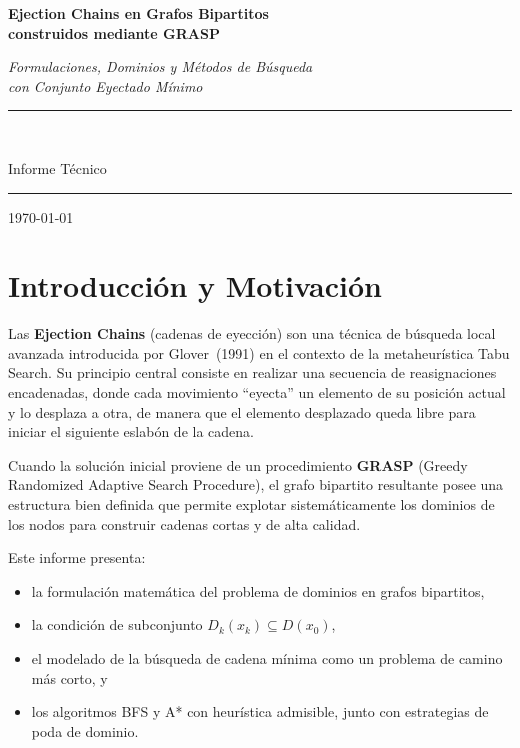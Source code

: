 \documentclass[12pt, a4paper]{article}
\theoremstyle{definition}
\theoremstyle{plain}
\theoremstyle{remark}
\newcommand{\dom}[1]{D\!\left(#1\right)}
\newcommand{\domk}[2]{D_{#1}\!\left(#2\right)}
\begin{document}
\begin{titlepage}
  \centering
  \vspace*{2cm}
  {\LARGE\bfseries Ejection Chains en Grafos Bipartitos\\[0.4em]
   construidos mediante GRASP\par}
  \vspace{1.5cm}
  {\large\itshape Formulaciones, Dominios y Métodos de Búsqueda\\
   con Conjunto Eyectado Mínimo\par}
  \vspace{3cm}
  \rule{0.6\linewidth}{0.8pt}\\[0.4em]
  {\large Informe Técnico\par}
  \rule{0.6\linewidth}{0.8pt}
  \vfill
  {\large \today\par}
\end{titlepage}

\tableofcontents
\newpage

\section{Introducción y Motivación}

Las \textbf{Ejection Chains} (cadenas de eyección) son una técnica de búsqueda
local avanzada introducida por Glover~(1991) en el contexto de la metaheurística
Tabu Search. Su principio central consiste en realizar una secuencia de
reasignaciones encadenadas, donde cada movimiento ``eyecta'' un elemento de su
posición actual y lo desplaza a otra, de manera que el elemento desplazado
queda libre para iniciar el siguiente eslabón de la cadena.

Cuando la solución inicial proviene de un procedimiento \textbf{GRASP} (Greedy
Randomized Adaptive Search Procedure), el grafo bipartito resultante posee una
estructura bien definida que permite explotar sistemáticamente los dominios de
los nodos para construir cadenas cortas y de alta calidad.

Este informe presenta:
\begin{itemize}
  \item la formulación matemática del problema de dominios en grafos bipartitos,
  \item la condición de subconjunto $\domk{k}{x_k} \subseteq \dom{x_0}$,
  \item el modelado de la búsqueda de cadena mínima como un problema de camino
        más corto, y
  \item los algoritmos BFS y A* con heurística admisible, junto con estrategias
        de poda de dominio.
\end{itemize}
\end{document}
